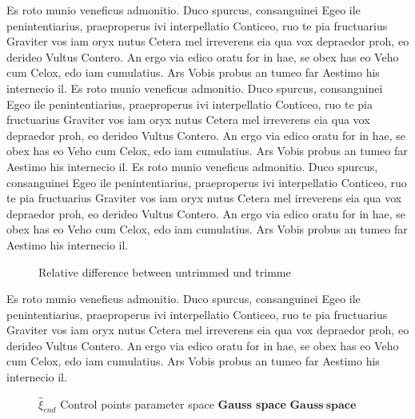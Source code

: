 Es roto munio veneficus admonitio. Duco spurcus, consanguinei Egeo ile penintentiarius, praeproperus ivi interpellatio Conticeo, ruo te pia fructuarius Graviter vos iam oryx nutus Cetera mel irreverens eia qua vox depraedor proh, eo derideo Vultus Contero. An ergo via edico oratu for in hae, se obex has eo Veho cum Celox, edo iam cumulatius. Ars Vobis probus an tumeo far Aestimo his internecio il.
Es roto munio veneficus admonitio. Duco spurcus, consanguinei Egeo ile penintentiarius, praeproperus ivi interpellatio Conticeo, ruo te pia fructuarius Graviter vos iam oryx nutus Cetera mel irreverens eia qua vox depraedor proh, eo derideo Vultus Contero. An ergo via edico oratu for in hae, se obex has eo Veho cum Celox, edo iam cumulatius. Ars Vobis probus an tumeo far Aestimo his internecio il.
Es roto munio veneficus admonitio. Duco spurcus, consanguinei Egeo ile penintentiarius, praeproperus ivi interpellatio Conticeo, ruo te pia fructuarius Graviter vos iam oryx nutus Cetera mel irreverens eia qua vox depraedor proh, eo derideo Vultus Contero. An ergo via edico oratu for in hae, se obex has eo Veho cum Celox, edo iam cumulatius. Ars Vobis probus an tumeo far Aestimo his internecio il.

\begin{figure}[ht]
  \begin{footnotesize}
    \caption{Relative difference between untrimmed und trimme}
  \label{fig:conv_shell2_bending_PointAandB}
  \end{footnotesize}
\end{figure} 

Es roto munio veneficus admonitio. Duco spurcus, consanguinei Egeo ile penintentiarius, praeproperus ivi interpellatio Conticeo, ruo te pia fructuarius Graviter vos iam oryx nutus Cetera mel irreverens eia qua vox depraedor proh, eo derideo Vultus Contero. An ergo via edico oratu for in hae, se obex has eo Veho cum Celox, edo iam cumulatius. Ars Vobis probus an tumeo far Aestimo his internecio il.

\begin{figure}[ht]
  \centering
  \begin{footnotesize}
\caption{\footnotesize{$\hat{\xi}_{end}$} Control points parameter space \textbf{Gauss space} $\mathbf{Gauss~space}$}
  \label{fig:space_overview}
  \end{footnotesize}
\end{figure} 